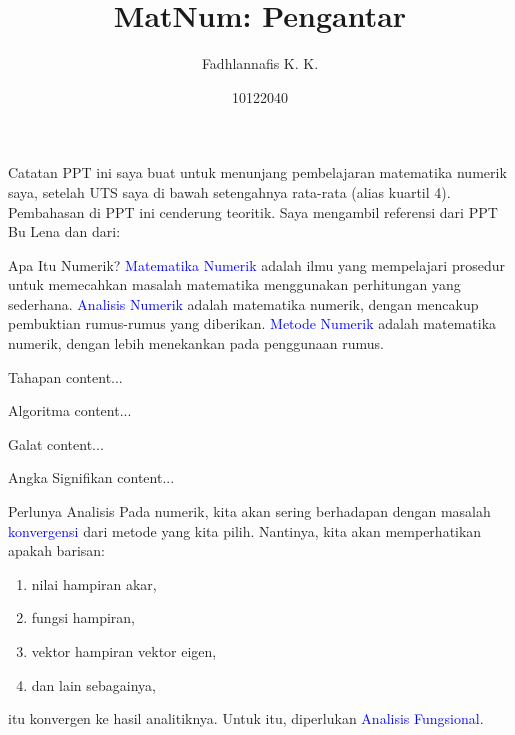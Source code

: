 \documentclass[xcolor={dvipsnames}]{beamer}
\title{MatNum: Pengantar}
\author{Fadhlannafis K. K.}
\date{10122040}
\newcommand{\emp}[1]{\textcolor{Blue}{#1}}
\begin{document}
	\begin{frame}[plain]
		\maketitle
	\end{frame}
	\begin{frame}{Catatan}
		PPT ini saya buat untuk menunjang pembelajaran matematika numerik saya, setelah UTS saya di bawah setengahnya rata-rata (alias kuartil 4). \newline
		Pembahasan di PPT ini cenderung teoritik. Saya mengambil referensi dari PPT Bu Lena dan dari:
		\nocite{*}
		\printbibliography
	\end{frame}
	\begin{frame}{Apa Itu Numerik?}
		\emp{Matematika Numerik} adalah ilmu yang mempelajari prosedur untuk memecahkan masalah matematika menggunakan perhitungan yang sederhana. \newline
		\emp{Analisis Numerik} adalah matematika numerik, dengan mencakup pembuktian rumus-rumus yang diberikan. \newline
		\emp{Metode Numerik} adalah matematika numerik, dengan lebih menekankan pada penggunaan rumus.
	\end{frame}
	\begin{frame}{Tahapan}
		content...
	\end{frame}
	\begin{frame}{Algoritma}
		content...
	\end{frame}
	\begin{frame}{Galat}
		content...
	\end{frame}
	\begin{frame}{Angka Signifikan}
		content...
	\end{frame}
	\begin{frame}{Perlunya Analisis}
		Pada numerik, kita akan sering berhadapan dengan masalah \emp{konvergensi} dari metode yang kita pilih. \newline
		Nantinya, kita akan memperhatikan apakah barisan:
		\begin{enumerate}
			\item nilai hampiran akar,
			\item fungsi hampiran,
			\item vektor hampiran vektor eigen,
			\item dan lain sebagainya,
		\end{enumerate}
		itu konvergen ke hasil analitiknya. Untuk itu, diperlukan \emp{Analisis Fungsional}.
	\end{frame}
\end{document}

